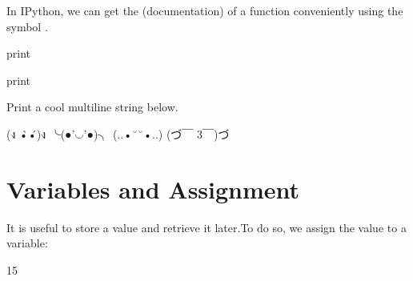 \documentclass[letterpaper,10pt,english]{sphinxmanual}
\begin{document}
In IPython, we can get the  (documentation) of a function conveniently using the symbol .

\begin{sphinxVerbatim}[commandchars=\\\{\}]
print
\end{sphinxVerbatim}

\begin{sphinxVerbatim}[commandchars=\\\{\}]
print
\end{sphinxVerbatim}

 Print a cool multi\sphinxhyphen{}line string below.

\begin{sphinxVerbatim}[commandchars=\\\{\}]
\end{sphinxVerbatim}

\begin{sphinxVerbatim}[commandchars=\\\{\}]
 (ง •̀\PYGZus{}•́)ง 
 ╰(●’◡’●)╮ 
 (..•˘\PYGZus{}˘•..)
 (づ￣ 3￣)づ
\end{sphinxVerbatim}


\section{Variables and Assignment}
\label{\detokenize{Lecture2/Values and Variables:variables-and-assignment}}
It is useful to store a value and retrieve it later.To do so, we assign the value to a variable:

\begin{sphinxVerbatim}[commandchars=\\\{\}]
  
  
\end{sphinxVerbatim}

\begin{sphinxVerbatim}[commandchars=\\\{\}]
15
\end{sphinxVerbatim}
\end{document}
